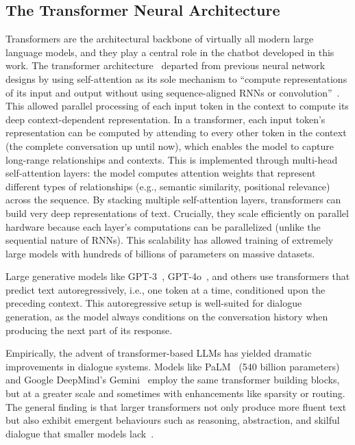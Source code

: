\subsection*{The Transformer Neural Architecture}
\label{ssec:transformers}
Transformers are the architectural backbone of virtually all modern large language models, and they play a central role in the chatbot developed in this work. The transformer architecture~\cite{vaswani2017attention} departed from previous neural network designs by using self-attention as its sole mechanism to ``compute representations of its input and output without using sequence-aligned RNNs or convolution''~\cite{vaswani2017attention}. This allowed parallel processing of each input token in the context to compute its deep context-dependent representation. In a transformer, each input token's representation can be computed by attending to every other token in the context (the complete conversation up until now), which enables the model to capture long-range relationships and contexts. This is implemented through multi-head self-attention layers: the model computes attention weights that represent different types of relationships (e.g., semantic similarity, positional relevance) across the sequence. By stacking multiple self-attention layers, transformers can build very deep representations of text. Crucially, they scale efficiently on parallel hardware because each layer's computations can be parallelized (unlike the sequential nature of RNNs). This scalability has allowed training of extremely large models with hundreds of billions of parameters on massive datasets.


Large generative models like GPT-3~\cite{brown2020language}, GPT-4o~\cite{openai2023gpt4}, and others use transformers that predict text autoregressively, i.e., one token at a time, conditioned upon the preceding context. This autoregressive setup is well-suited for dialogue generation, as the model always conditions on the conversation history when producing the next part of its response.


Empirically, the advent of transformer-based LLMs has yielded dramatic improvements in dialogue systems. Models like PaLM~\cite{Chowdhery2023palm} (540 billion parameters) and Google DeepMind's Gemini~\cite{comanici2025gemini25pushingfrontier} employ the same transformer building blocks, but at a greater scale and sometimes with enhancements like sparsity or routing. The general finding is that larger transformers not only produce more fluent text but also exhibit emergent behaviours such as reasoning, abstraction, and skilful dialogue that smaller models lack~\cite{Zoph2022emergent,berti2025emergentabilitieslargelanguage}.



